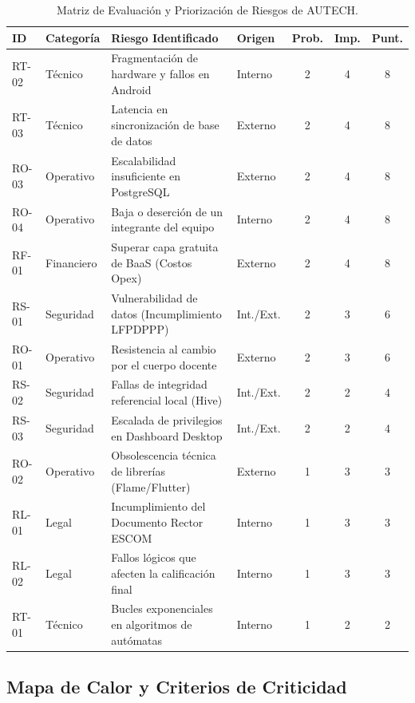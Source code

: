 \begin{table}[htbp]
    \centering
    \small
    \caption{Matriz de Evaluación y Priorización de Riesgos de AUTECH.}
    \label{tab:matriz_riesgos_consolidada}
    \begin{tabular}{l l p{6.2cm} l c c c}
        \toprule
        \textbf{ID} & \textbf{Categoría} & \textbf{Riesgo Identificado} & \textbf{Origen} & \textbf{Prob.} & \textbf{Imp.} & \textbf{Punt.} \\
        \midrule
        RT-02 & Técnico & Fragmentación de hardware y fallos en Android & Interno & 2 & 4 & 8 \\
        RT-03 & Técnico & Latencia en sincronización de base de datos & Externo & 2 & 4 & 8 \\
        RO-03 & Operativo & Escalabilidad insuficiente en PostgreSQL & Externo & 2 & 4 & 8 \\
        RO-04 & Operativo & Baja o deserción de un integrante del equipo & Interno & 2 & 4 & 8 \\
        RF-01 & Financiero & Superar capa gratuita de BaaS (Costos Opex) & Externo & 2 & 4 & 8 \\
        \addlinespace
        RS-01 & Seguridad & Vulnerabilidad de datos (Incumplimiento LFPDPPP) & Int./Ext. & 2 & 3 & 6 \\
        RO-01 & Operativo & Resistencia al cambio por el cuerpo docente & Externo & 2 & 3 & 6 \\
        \addlinespace
        RS-02 & Seguridad & Fallas de integridad referencial local (Hive) & Int./Ext. & 2 & 2 & 4 \\
        RS-03 & Seguridad & Escalada de privilegios en Dashboard Desktop & Int./Ext. & 2 & 2 & 4 \\
        \addlinespace
        RO-02 & Operativo & Obsolescencia técnica de librerías (Flame/Flutter) & Externo & 1 & 3 & 3 \\
        RL-01 & Legal & Incumplimiento del Documento Rector ESCOM & Interno & 1 & 3 & 3 \\
        RL-02 & Legal & Fallos lógicos que afecten la calificación final & Interno & 1 & 3 & 3 \\
        \addlinespace
        RT-01 & Técnico & Bucles exponenciales en algoritmos de autómatas & Interno & 1 & 2 & 2 \\
        \bottomrule
    \end{tabular}
\end{table}

\subsection{Mapa de Calor y Criterios de Criticidad}
\label{subsec:mapa_calor_riesgos}

